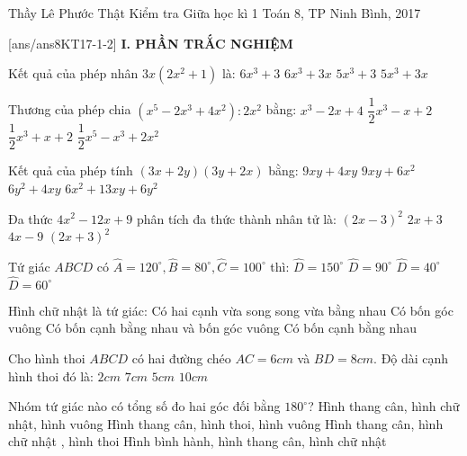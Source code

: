 \begin{name}
{Thầy  Lê Phước Thật}
{Kiểm tra Giữa học kì 1 Toán 8, TP Ninh Bình, 2017}
\end{name}
[ans/ans8KT17-1-2]
\noindent\textbf{I. PHẦN TRẮC NGHIỆM}
\setcounter{ex}{0}
\begin{ex}%
Kết quả của phép nhân $ 3x(2x^{2}+1) $ là:
\choice
{$ 6x^3+3 $}
{\True $ 6x^3+3x $}
{$ 5x^3+3 $}
{$ 5x^3+3x $}
\end{ex}
\begin{ex}%
Thương của phép chia $ (x^5-2x^3+4x^2):2x^2 $ bằng:
\choice
{$ x^3-2x+4 $}
{\True $\dfrac{1}{2} x^3-x+2 $}
{$\dfrac{1}{2} x^3+x+2 $}
{ $\dfrac{1}{2} x^5-x^3+2x^2 $ }
\end{ex}
\begin{ex}%
Kết quả của phép tính $ (3x+2y)(3y+2x) $ bằng:
\choice
{$ 9xy+4xy $}
{$ 9xy+6x^2 $}
{$ 6y^2+4xy $}
{\True $ 6x^2+13xy+6y^2$}
\end{ex}
\begin{ex}%
Đa thức $ 4x^2-12x+9 $  phân tích đa thức thành nhân tử là:
\choice
{\True $ (2x-3)^2 $}
{$ 2x+3 $}
{$ 4x-9 $}
{ $ (2x+3)^2 $}
\end{ex}
\begin{ex}%
Tứ giác $ ABCD $ có $ \widehat{A} =120^\circ,  \widehat{B} =80^\circ, \widehat{C} =100^\circ  $ thì:
\choice
{$ \widehat{D} =150^\circ  $}
{$ \widehat{D} =90^\circ  $}
{$ \widehat{D} =40^\circ  $}
{\True $ \widehat{D} =60^\circ  $}
\end{ex}
\begin{ex}%
Hình chữ nhật là tứ giác:
\choice
{Có hai cạnh vừa song song vừa bằng nhau}
{\True Có bốn góc vuông}
{Có bốn cạnh bằng nhau và bốn góc vuông}
{Có bốn cạnh bằng nhau}
\end{ex}
\begin{ex}%
Cho hình thoi $ ABCD $ có hai đường chéo $ AC = 6 cm $ và $ BD = 8 cm $. Độ dài cạnh hình thoi đó là:
\choice
{$ 2 cm $}
{$ 7 cm $}
{\True $ 5 cm $}
{$ 10 cm $}
\end{ex}
\begin{ex}%
Nhóm tứ giác nào có tổng số đo hai góc đối bằng $ 180^\circ $?
\choice
{\True Hình thang cân, hình chữ nhật, hình vuông}
{Hình thang cân, hình thoi, hình vuông}
{Hình thang cân, hình chữ nhật , hình thoi}
{Hình bình hành, hình thang cân, hình chữ nhật}
\end{ex}

